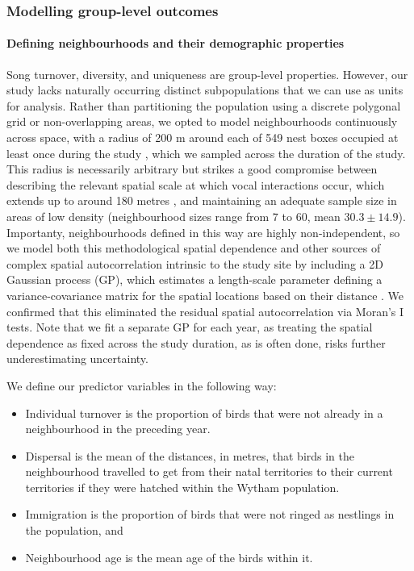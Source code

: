 \documentclass[9pt, onecolumn, twoside, lineno]{gsajnl}
\begin{document}
\subsubsection{\nmu Modelling group-level outcomes}
\label{sc:group-properties}


\paragraph{Defining neighbourhoods and their demographic properties}

Song turnover, diversity, and uniqueness are group-level properties. However, our study lacks naturally occurring distinct subpopulations that we can use as units for analysis. Rather than partitioning the population using a discrete polygonal grid or non-overlapping areas, we opted to model neighbourhoods continuously across space, with a radius of 200 m around each of 549 nest boxes occupied at least once during the study \autocite{fayet2014}, which we sampled across the duration of the study. This radius is necessarily arbitrary but strikes a good compromise between describing the relevant spatial scale at which vocal interactions occur, which extends up to around 180 metres \autocite{bircher2021, blumenrath2004}, and maintaining an adequate sample size in areas of low density (neighbourhood sizes range from $7$ to $60$, mean $30.3\pm14.9$). Importanty, neighbourhoods defined in this way are highly non-independent, so we model both this methodological spatial dependence and other sources of complex spatial autocorrelation intrinsic to the study site by including a 2D Gaussian process (GP), which estimates a length-scale parameter defining a variance-covariance matrix for the spatial locations based on their distance \autocite{dearmon2016, gelfand2016, wright2021}. We confirmed that this eliminated the residual spatial autocorrelation via Moran's I tests. Note that we fit a separate GP for each year, as treating the spatial dependence as fixed across the study duration, as is often done, risks further underestimating uncertainty.

\noindent
We define our predictor variables in the following way: 
\begin{itemize}
    \item Individual turnover is the proportion of birds that were not already in a neighbourhood in the preceding year.
    \item Dispersal is the mean of the distances, in metres, that birds in the neighbourhood travelled to get from their natal territories to their current territories if they were hatched within the Wytham population. 
    \item Immigration is the proportion of birds that were not ringed as nestlings in the population, and 
    \item Neighbourhood age is the mean age of the birds within it. 
\end{itemize}
\end{document}
